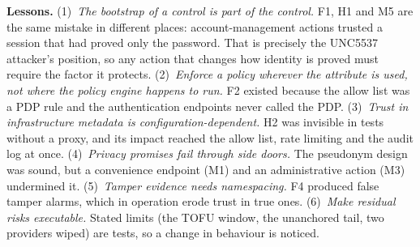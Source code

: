 \documentclass[conference]{IEEEtran}
\begin{document}
\textbf{Lessons.}
(1)~\emph{The bootstrap of a control is part of the control.} F1, H1 and M5 are the same mistake in different places: account-management actions trusted a session that had proved only the password. That is precisely the UNC5537 attacker's position, so any action that changes how identity is proved must require the factor it protects.
(2)~\emph{Enforce a policy wherever the attribute is used, not where the policy engine happens to run.} F2 existed because the allow list was a PDP rule and the authentication endpoints never called the PDP.
(3)~\emph{Trust in infrastructure metadata is configuration-dependent.} H2 was invisible in tests without a proxy, and its impact reached the allow list, rate limiting and the audit log at once.
(4)~\emph{Privacy promises fail through side doors.} The pseudonym design was sound, but a convenience endpoint (M1) and an administrative action (M3) undermined it.
(5)~\emph{Tamper evidence needs namespacing.} F4 produced false tamper alarms, which in operation erode trust in true ones.
(6)~\emph{Make residual risks executable.} Stated limits (the TOFU window, the unanchored tail, two providers wiped) are tests, so a change in behaviour is noticed.

\end{document}
